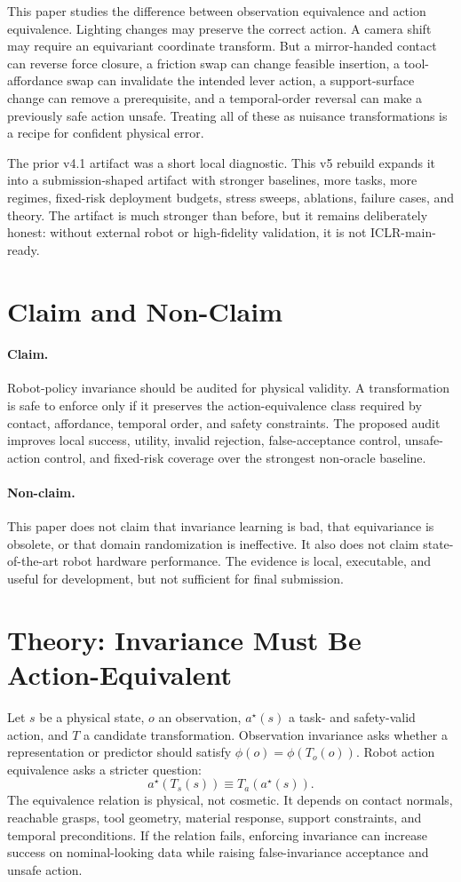\documentclass{article}
\begin{document}
This paper studies the difference between observation equivalence and action equivalence. Lighting changes may preserve the correct action. A camera shift may require an equivariant coordinate transform. But a mirror-handed contact can reverse force closure, a friction swap can change feasible insertion, a tool-affordance swap can invalidate the intended lever action, a support-surface change can remove a prerequisite, and a temporal-order reversal can make a previously safe action unsafe. Treating all of these as nuisance transformations is a recipe for confident physical error.

The prior v4.1 artifact was a short local diagnostic. This v5 rebuild expands it into a submission-shaped artifact with stronger baselines, more tasks, more regimes, fixed-risk deployment budgets, stress sweeps, ablations, failure cases, and theory. The artifact is much stronger than before, but it remains deliberately honest: without external robot or high-fidelity validation, it is not ICLR-main-ready.

\section{Claim and Non-Claim}
\paragraph{Claim.} Robot-policy invariance should be audited for physical validity. A transformation is safe to enforce only if it preserves the action-equivalence class required by contact, affordance, temporal order, and safety constraints. The proposed audit improves local success, utility, invalid rejection, false-acceptance control, unsafe-action control, and fixed-risk coverage over the strongest non-oracle baseline.

\paragraph{Non-claim.} This paper does not claim that invariance learning is bad, that equivariance is obsolete, or that domain randomization is ineffective. It also does not claim state-of-the-art robot hardware performance. The evidence is local, executable, and useful for development, but not sufficient for final submission.

\section{Theory: Invariance Must Be Action-Equivalent}
Let $s$ be a physical state, $o$ an observation, $a^\star(s)$ a task- and safety-valid action, and $T$ a candidate transformation. Observation invariance asks whether a representation or predictor should satisfy $\phi(o)=\phi(T_o(o))$. Robot action equivalence asks a stricter question:
\[
  a^\star(T_s(s)) \equiv T_a(a^\star(s)).
\]
The equivalence relation is physical, not cosmetic. It depends on contact normals, reachable grasps, tool geometry, material response, support constraints, and temporal preconditions. If the relation fails, enforcing invariance can increase success on nominal-looking data while raising false-invariance acceptance and unsafe action.
\end{document}
